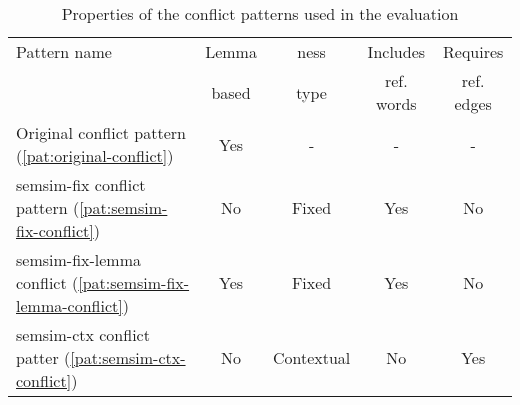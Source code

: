 \documentclass[11pt, numbers=noenddot]{scrreprt}
\begin{document}
\begin{table}
\centering
\begin{tabular}{lcccc}
\toprule
\multicolumn{1}{l}{Pattern name}		& \multicolumn{1}{c}{Lemma}		& \multicolumn{1}{c}{\gls{ness}}	& \multicolumn{1}{c}{Includes}		& \multicolumn{1}{c}{Requires} \\
\multicolumn{1}{l}{} 				& \multicolumn{1}{c}{based} 		& \multicolumn{1}{c}{type} 		& \multicolumn{1}{c}{ref. words} 	& \multicolumn{1}{c}{ref. edges} \\
\midrule
Original conflict pattern (\ref{pat:original-conflict})					& Yes 		& - 		& -			& - \\
semsim-fix conflict pattern (\ref{pat:semsim-fix-conflict})				& No		& Fixed		& Yes		& No \\
semsim-fix-lemma conflict (\ref{pat:semsim-fix-lemma-conflict}) 		& Yes 		& Fixed		& Yes		& No \\
semsim-ctx conflict patter (\ref{pat:semsim-ctx-conflict})				& No		& Contextual	& No		& Yes \\
\bottomrule
\end{tabular}
\caption{Properties of the conflict patterns used in the evaluation}
\label{tab:evaluation-patterns}
\end{table}
\end{document}
